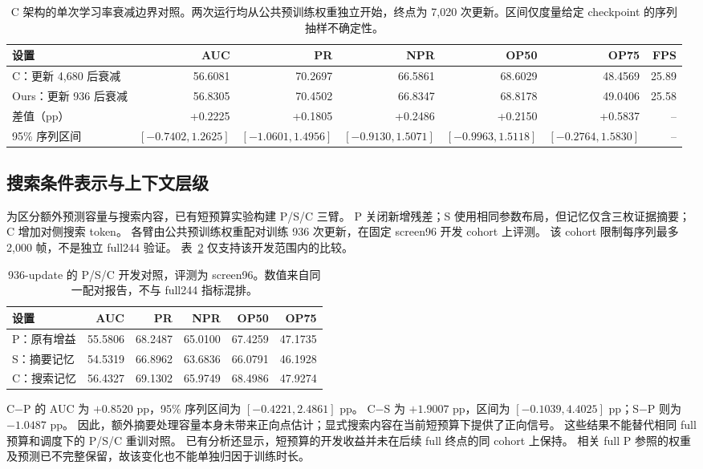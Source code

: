 \documentclass[journal]{IEEEtran}
\begin{document}
\begin{table}[t]
\centering
\caption{C 架构的单次学习率衰减边界对照。两次运行均从公共预训练权重独立开始，终点为 7,020 次更新。区间仅度量给定 checkpoint 的序列抽样不确定性。}
\label{tab:schedule}
\small
\setlength{\tabcolsep}{3pt}
\begin{tabular}{@{}lrrrrrr@{}}
\toprule
设置 & AUC & PR & NPR & OP50 & OP75 & FPS\\
\midrule
C：更新 4,680 后衰减 & 56.6081 & 70.2697 & 66.5861 & 68.6029 & 48.4569 & 25.89\\
Ours：更新 936 后衰减 & 56.8305 & 70.4502 & 66.8347 & 68.8178 & 49.0406 & 25.58\\
差值（pp） & +0.2225 & +0.1805 & +0.2486 & +0.2150 & +0.5837 & --\\
95\% 序列区间 & $[-0.7402,1.2625]$ & $[-1.0601,1.4956]$ & $[-0.9130,1.5071]$ & $[-0.9963,1.5118]$ & $[-0.2764,1.5830]$ & --\\
\bottomrule
\end{tabular}
\end{table}

\subsection{搜索条件表示与上下文层级}
为区分额外预测容量与搜索内容，已有短预算实验构建 P/S/C 三臂。
P 关闭新增残差；S 使用相同参数布局，但记忆仅含三枚证据摘要；C 增加对侧搜索 token。
各臂由公共预训练权重配对训练 936 次更新，在固定 screen96 开发 cohort 上评测。
该 cohort 限制每序列最多 2,000 帧，不是独立 full244 验证。
表~\ref{tab:short} 仅支持该开发范围内的比较。

\begin{table}[t]
\centering
\caption{936-update 的 P/S/C 开发对照，评测为 screen96。数值来自同一配对报告，不与 full244 指标混排。}
\label{tab:short}
\footnotesize
\setlength{\tabcolsep}{2pt}
\begin{tabular}{@{}lrrrrr@{}}
\toprule
设置 & AUC & PR & NPR & OP50 & OP75\\
\midrule
P：原有增益 & 55.5806 & 68.2487 & 65.0100 & 67.4259 & 47.1735\\
S：摘要记忆 & 54.5319 & 66.8962 & 63.6836 & 66.0791 & 46.1928\\
C：搜索记忆 & 56.4327 & 69.1302 & 65.9749 & 68.4986 & 47.9274\\
\bottomrule
\end{tabular}
\end{table}

C$-$P 的 AUC 为 $+0.8520$ pp，95\% 序列区间为 $[-0.4221,2.4861]$ pp。
C$-$S 为 $+1.9007$ pp，区间为 $[-0.1039,4.4025]$ pp；S$-$P 则为 $-1.0487$ pp。
因此，额外摘要处理容量本身未带来正向点估计；显式搜索内容在当前短预算下提供了正向信号。
这些结果不能替代相同 full 预算和调度下的 P/S/C 重训对照。
已有分析还显示，短预算的开发收益并未在后续 full 终点的同 cohort 上保持。
相关 full P 参照的权重及预测已不完整保留，故该变化也不能单独归因于训练时长。
\end{document}
